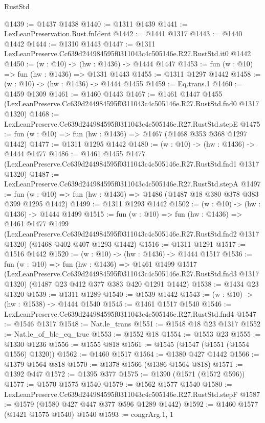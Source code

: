 \begin{lexlean}{RustStd}
\begin{coremodule}
@1439 := @1437 @1438
@1440 := @1311 @1439
@1441 := LexLeanPreservation.Rust.fnIdent
@1442 := @1441 @1317
@1443 := @1440 @1442
@1444 := @1310 @1443
@1447 := @1311 LexLeanPreserve.Cc639d244984595f0311043c4c505146e.R27.RustStd.it0 @1442
@1450 := (w : @10) -> (hw : @1436) -> @1444 @1447
@1453 := fun (w : @10) => fun (hw : @1436) => @1331 @1443
@1455 := @1311 @1297 @1442
@1458 := (w : @10) -> (hw : @1436) -> @1444 @1455
@1459 := Eq.trans.{1}
@1460 := @1459 @1309
@1461 := @1460 @1443
@1467 := @1461
    @1447
    @1455
    (LexLeanPreserve.Cc639d244984595f0311043c4c505146e.R27.RustStd.fnd0 @1317 @1320)
@1468 := LexLeanPreserve.Cc639d244984595f0311043c4c505146e.R27.RustStd.stepE
@1475 := fun (w : @10) => fun (hw : @1436) => @1467 (@1468 @353 @368 @1297 @1442)
@1477 := @1311 @1295 @1442
@1480 := (w : @10) -> (hw : @1436) -> @1444 @1477
@1486 := @1461
    @1455
    @1477
    (LexLeanPreserve.Cc639d244984595f0311043c4c505146e.R27.RustStd.fnd1 @1317 @1320)
@1487 := LexLeanPreserve.Cc639d244984595f0311043c4c505146e.R27.RustStd.stepA
@1497 := fun (w : @10) => fun (hw : @1436) => @1486 (@1487 @18 @380 @378 @383 @399 @1295 @1442)
@1499 := @1311 @1293 @1442
@1502 := (w : @10) -> (hw : @1436) -> @1444 @1499
@1515 := fun (w : @10) =>
  fun (hw : @1436) =>
  @1461
    @1477
    @1499
    (LexLeanPreserve.Cc639d244984595f0311043c4c505146e.R27.RustStd.fnd2 @1317 @1320)
    (@1468 @402 @407 @1293 @1442)
@1516 := @1311 @1291
@1517 := @1516 @1442
@1520 := (w : @10) -> (hw : @1436) -> @1444 @1517
@1536 := fun (w : @10) =>
  fun (hw : @1436) =>
  @1461
    @1499
    @1517
    (LexLeanPreserve.Cc639d244984595f0311043c4c505146e.R27.RustStd.fnd3 @1317 @1320)
    (@1487 @23 @412 @377 @383 @420 @1291 @1442)
@1538 := @1434 @23 @1320
@1539 := @1311 @1289
@1540 := @1539 @1442
@1543 := (w : @10) -> (hw : @1538) -> @1444 @1540
@1545 := @1461 @1517 @1540
@1546 := LexLeanPreserve.Cc639d244984595f0311043c4c505146e.R27.RustStd.fnd4
@1547 := @1546 @1317
@1548 := Nat.le_trans
@1551 := @1548 @18 @23 @1317
@1552 := Nat.le_of_ble_eq_true
@1553 := @1552 @18
@1554 := @1553 @23
@1555 := @1330 @1236
@1556 := @1555 @818
@1561 := @1545 (@1547 (@1551 (@1554 @1556) @1320))
@1562 := @1460 @1517
@1564 := @1380 @427 @1442
@1566 := @1379 @1564 @818
@1570 := @1378 @1566 (@1386 @1564 @818)
@1571 := @1392 @447
@1572 := @1395 @377
@1575 := @1390 (@1571 (@1572 @596))
@1577 := @1570 @1575 @1540
@1579 := @1562 @1577 @1540
@1580 := LexLeanPreserve.Cc639d244984595f0311043c4c505146e.R27.RustStd.stepF
@1587 := @1579 (@1580 @427 @447 @377 @596 @1289 @1442)
@1592 := @1460 @1577 (@1421 @1575 @1540) @1540
@1593 := congrArg.{1, 1}

\end{coremodule}
\end{lexlean}
